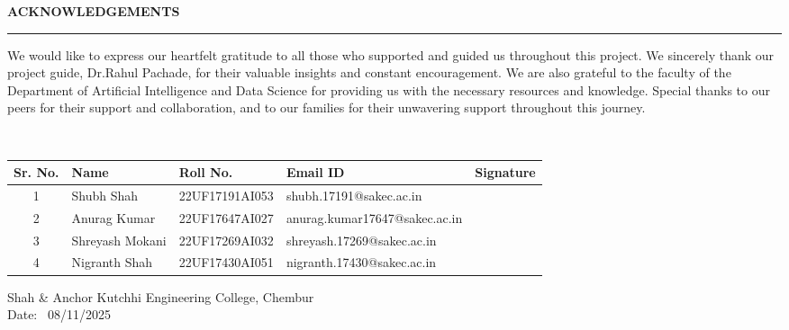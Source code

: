 \thispagestyle{empty}

\begin{center}
{\Large {\bf \uppercase{Acknowledgements}}}
\end{center}

\vspace{\baselineskip}
\hrule
\vspace{2\baselineskip}
We would like to express our heartfelt gratitude to all those who supported
and guided us throughout this project. We sincerely thank our project guide, Dr.Rahul Pachade, for their valuable insights and constant encouragement. We are also
grateful to the faculty of the Department of Artificial Intelligence and Data Science
for providing us with the necessary resources and knowledge. Special thanks to our
peers for their support and collaboration, and to our families for their unwavering
support throughout this journey.


\bigskip


\bigskip





\noindent
\vspace{\baselineskip} \\
\begin{table}[htbp]

\begin{tabular}{|c|l|l|l|l|}
\hline
\textbf{Sr. No.} & \textbf{Name} & \textbf{Roll No.} & \textbf{Email ID}  &Signature\\ \hline
1 & Shubh Shah& 22UF17191AI053& shubh.17191@sakec.ac.in&\\ \hline
2 & Anurag Kumar& 22UF17647AI027& anurag.kumar17647@sakec.ac.in&\\ \hline
3 & Shreyash Mokani& 22UF17269AI032& shreyash.17269@sakec.ac.in&\\ \hline
4 & Nigranth Shah& 22UF17430AI051& nigranth.17430@sakec.ac.in&\\ \hline
\end{tabular}
\end{table}
\newline
Shah \& Anchor Kutchhi Engineering College, Chembur \\
Date: \ 08/11/2025